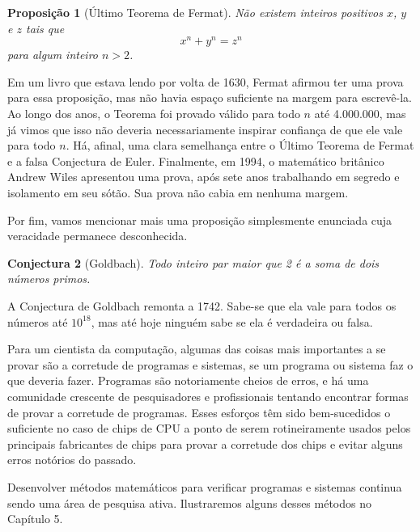 \documentclass[12pt]{article}
\newtheorem{proposicao}{Proposição}[subsection]
\newtheorem{conjectura}[proposicao]{Conjectura}
\begin{document}
\begin{proposicao}[Último Teorema de Fermat]
	Não existem inteiros positivos $x$, $y$ e $z$ tais que
	$$x^n + y^n = z^n$$
	para algum inteiro $n > 2$.
\end{proposicao}

Em um livro que estava lendo por volta de 1630, Fermat afirmou ter uma prova
para essa proposição, mas não havia espaço suficiente na margem para
escrevê-la. Ao longo dos anos, o Teorema foi provado válido para todo $n$ até
4.000.000, mas já vimos que isso não deveria necessariamente inspirar confiança
de que ele vale para todo $n$. Há, afinal, uma clara semelhança entre o Último
Teorema de Fermat e a falsa Conjectura de Euler. Finalmente, em 1994, o
matemático britânico Andrew Wiles apresentou uma prova, após sete anos
trabalhando em segredo e isolamento em seu sótão. Sua prova não cabia em
nenhuma margem.

Por fim, vamos mencionar mais uma proposição simplesmente enunciada cuja
veracidade permanece desconhecida.

\begin{conjectura}[Goldbach]
	Todo inteiro par maior que 2 é a soma de dois números primos.
\end{conjectura}

A Conjectura de Goldbach remonta a 1742. Sabe-se que ela vale para todos os
números até $10^{18}$, mas até hoje ninguém sabe se ela é verdadeira ou falsa.

Para um cientista da computação, algumas das coisas mais importantes a se
provar são a corretude de programas e sistemas, se um programa ou sistema faz o
que deveria fazer. Programas são notoriamente cheios de erros, e há uma
comunidade crescente de pesquisadores e profissionais tentando encontrar formas
de provar a corretude de programas. Esses esforços têm sido bem-sucedidos o
suficiente no caso de chips de CPU a ponto de serem rotineiramente usados pelos
principais fabricantes de chips para provar a corretude dos chips e evitar
alguns erros notórios do passado.

Desenvolver métodos matemáticos para verificar programas e sistemas continua
sendo uma área de pesquisa ativa. Ilustraremos alguns desses métodos no
Capítulo 5.
\end{document}
